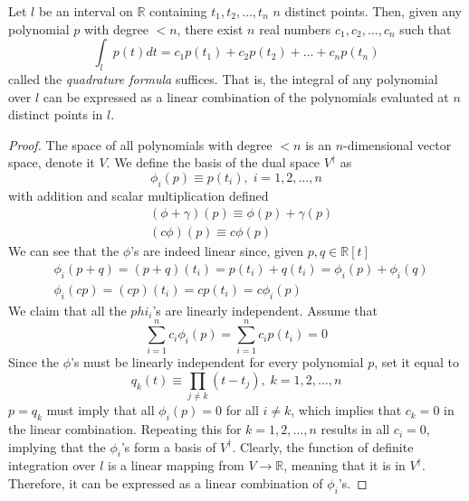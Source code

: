   \begin{theorem}
    Let $l$ be an interval on $\mathbb{R}$ containing $t_1, t_2, \ldots, t_n$ $n$ distinct points. Then, given any polynomial $p$ with degree $< n$, there exist $n$ real numbers $c_1, c_2, \ldots, c_n$ such that
    \begin{equation}
      \int_l p(t) d t = c_1 p(t_1) + c_2 p(t_2) + \ldots + c_n p(t_n)
    \end{equation}
    called the \textit{quadrature formula} suffices. That is, the integral of any polynomial over $l$ can be expressed as a linear combination of the polynomials evaluated at $n$ distinct points in $l$. 
  \end{theorem}
  \begin{proof}
    The space of all polynomials with degree $< n$ is an $n$-dimensional vector space, denote it $V$. We define the basis of the dual space $V^\dagger$ as 
    \begin{equation}
      \phi_i (p) \equiv p(t_i), \; i = 1, 2, \ldots, n
    \end{equation}
    with addition and scalar multiplication defined
    \begin{align*}
      & (\phi + \gamma) (p) \equiv \phi(p) + \gamma(p) \\
      & (c \phi) (p) \equiv c \phi (p) 
    \end{align*}
    We can see that the $\phi$'s are indeed linear since, given $p, q \in \mathbb{R}[t]$
    \begin{align*}
      & \phi_i (p + q) = (p + q) (t_i) = p(t_i) + q(t_i) = \phi_i (p) + \phi_i (q) \\
      & \phi_i (c p) = (c p) (t_i) = c p(t_i) = c \phi_i (p)
    \end{align*}
    We claim that all the $phi_i$'s are linearly independent. Assume that 
    \begin{equation}
      \sum_{i=1}^n c_i \phi_i (p) = \sum_{i=1}^n c_i p(t_i) = 0
    \end{equation}
    Since the $\phi$'s must be linearly independent for every polynomial $p$, set it equal to
    \begin{equation}
      q_k (t) \equiv \prod_{j \neq k} (t - t_j), \; k = 1, 2, \ldots, n
    \end{equation}
    $p = q_k$ must imply that all $\phi_i (p) = 0$ for all $i \neq k$, which implies that $c_k = 0$ in the linear combination. Repeating this for $k = 1, 2, \ldots, n$ results in all $c_i = 0$, implying that the $\phi_i$'s form a basis of $V^\dagger$. Clearly, the function of definite integration over $l$ is a linear mapping from $V \longrightarrow \mathbb{R}$, meaning that it is in $V^\dagger$. Therefore, it can be expressed as a linear combination of $\phi_i$'s. 
  \end{proof}

